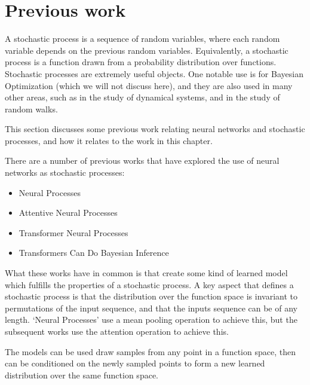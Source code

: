 \section{Previous work}
\label{s:previous-work}

A stochastic process is a sequence of random variables, where each random variable depends on the previous random variables. Equivalently, a stochastic process is a function drawn from a probability distribution over functions. Stochastic processes are extremely useful objects. One notable use is for Bayesian Optimization (which we will not discuss here), and they are also used in many other areas, such as in the study of dynamical systems, and in the study of random walks.

This section discusses some previous work relating neural networks and stochastic processes, and how it relates to the work in this chapter.

There are a number of previous works that have explored the use of neural networks as stochastic processes:
\begin{itemize}
    \item Neural Processes \cite{neural-processes}
    \item Attentive Neural Processes \cite{attentive-neural-processes}
    \item Transformer Neural Processes \cite{transformer-neural-processes}
    \item Transformers Can Do Bayesian Inference \cite{transformers-bayesian}
\end{itemize}

What these works have in common is that create some kind of learned model which fulfills the properties of a stochastic process. A key aspect that defines a stochastic process is that the distribution over the function space is invariant to permutations of the input sequence, and that the inputs sequence can be of any length. `Neural Processes' use a mean pooling operation to achieve this, but the subsequent works use the attention operation to achieve this.

The models can be used draw samples from any point in a function space, then can be conditioned on the newly sampled points to form a new learned distribution over the same function space.

